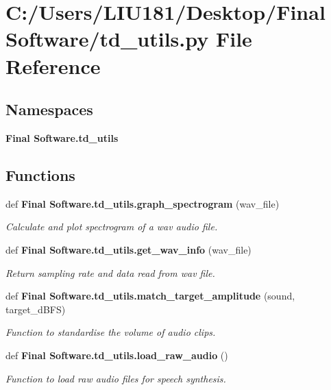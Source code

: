 \section{C\+:/\+Users/\+L\+I\+U181/\+Desktop/\+Final Software/td\+\_\+utils.py File Reference}
\label{td__utils_8py}
\subsection*{Namespaces}
\begin{DoxyCompactItemize}
\item 
 \textbf{ Final Software.\+td\+\_\+utils}
\end{DoxyCompactItemize}
\subsection*{Functions}
\begin{DoxyCompactItemize}
\item 
def \textbf{ Final Software.\+td\+\_\+utils.\+graph\+\_\+spectrogram} (wav\+\_\+file)
\begin{DoxyCompactList}\small\item\em Calculate and plot spectrogram of a wav audio file. \end{DoxyCompactList}\item 
def \textbf{ Final Software.\+td\+\_\+utils.\+get\+\_\+wav\+\_\+info} (wav\+\_\+file)
\begin{DoxyCompactList}\small\item\em Return sampling rate and data read from wav file. \end{DoxyCompactList}\item 
def \textbf{ Final Software.\+td\+\_\+utils.\+match\+\_\+target\+\_\+amplitude} (sound, target\+\_\+d\+B\+FS)
\begin{DoxyCompactList}\small\item\em Function to standardise the volume of audio clips. \end{DoxyCompactList}\item 
def \textbf{ Final Software.\+td\+\_\+utils.\+load\+\_\+raw\+\_\+audio} ()
\begin{DoxyCompactList}\small\item\em Function to load raw audio files for speech synthesis. \end{DoxyCompactList}\end{DoxyCompactItemize}
